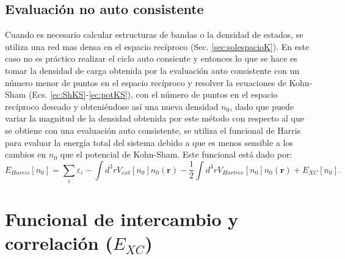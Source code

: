    \subsection{Evaluaci\'on no auto consistente} \label{subsec:nscf}
   Cuando es necesario calcular estructuras de bandas o la densidad de estados, se utiliza una red mas densa en el espacio rec\'iproco (Sec. \ref{sec:solespacioK}). En este caso no es pr\'actico realizar el ciclo auto consiente y entonces lo que se hace es tomar la densidad de carga obtenida por la evaluaci\'on auto consistente con un n\'umero menor de puntos en el espacio rec\'iproco  y resolver la ecuaciones de Kohn-Sham (Ecs. \ref{ec:ShKS}-\ref{ec:potKS}), con el n\'umero de puntos en el espacio rec\'iproco deseado y obteniéndose así  una nueva densidad $n_0$,  dado que puede variar la magnitud de la densidad obtenida por este m\'etodo con respecto al que se obtiene con una evaluaci\'on auto consistente, se utiliza el  funcional de Harris  para evaluar la energ\'ia total del sistema debido a que es menos sensible a los cambios en $n_0$ que el potencial de Kohn-Sham. Este funcional est\'a dado por\cite{PhysRevB.31.1770}:
   \begin{equation}
   E_{Harris} [n_0] = \sum_{i} \varepsilon_i - \int d^3 r V_{ext} [n_0] n_0 (\pmb{r}) - \frac{1}{2} \int d^3 r V_{Hartree} [n_0] n_0 (\pmb{r}) + E_{XC} [n_0]. \label{ec:FuncHarris}
   \end{equation}
  
   \section{Funcional de intercambio y correlaci\'on ($E_{XC} $)}\label{sec2:xc}
